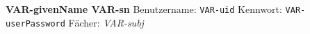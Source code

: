 \bigskip\textbf{\large VAR-givenName VAR-sn}\medskip
Benutzername: \texttt{VAR-uid}
Kennwort: \texttt{VAR-userPassword}\smallskip
Fächer: \textsl{VAR-subj}
~

